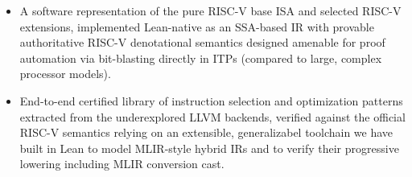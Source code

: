 \documentclass[review, anonymous, acmsmall, screen]{acmart}
\begin{document}
\begin{itemize}
\item {A software representation of the pure RISC-V base ISA and selected RISC-V extensions, implemented Lean-native
 as an SSA-based IR with provable authoritative RISC-V denotational semantics designed amenable for
  proof automation via bit-blasting directly in ITPs (compared to large, complex processor models).}
\item{End-to-end certified library of instruction selection and optimization patterns extracted from
 the underexplored LLVM backends, verified against the official RISC-V semantics relying on an extensible,
  generalizabel toolchain we have built in Lean to model MLIR-style hybrid IRs and to verify their progressive
   lowering including MLIR conversion cast.}


\end{itemize}
\end{document}
